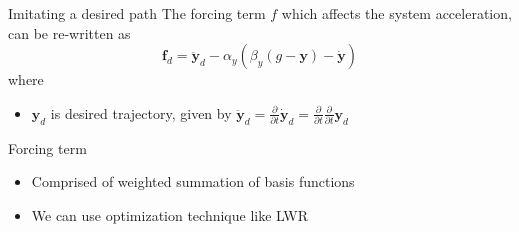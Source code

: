 \documentclass[aspectratio=43,11pt,xcolor={dvipsnames}]{beamer}
\begin{document}
\begin{frame}[noframenumbering]{Imitating a desired path}
	\linespread{1.4}
	The forcing term $f$ which affects the system acceleration, can be re-written as
	\begin{equation}
		\textbf{f}_d = \ddot{\textbf{y}}_d - \alpha_y ( \beta_y (g - \textbf{y}) - \dot{\textbf{y}})
		\label{eq:imitate_f}
	\end{equation}
	where
	\begin{itemize}
		\item $\textbf{y}_d$ is desired trajectory, given by $\ddot{\textbf{y}}_d = \frac{\partial}{\partial t} \dot{\textbf{y}}_d = \frac{\partial}{\partial t} \frac{\partial}{\partial t} \textbf{y}_d$
	\end{itemize}
														
	\begin{exampleblock}{Forcing term}					
		\begin{itemize}
			\item Comprised of weighted summation of basis functions
			\item We can use optimization technique like LWR\footnotemark
		\end{itemize}
	\end{exampleblock}
				
\end{frame}
\end{document}
